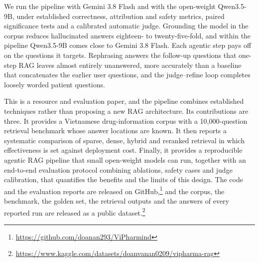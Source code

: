 We run the pipeline with Gemini 3.8 Flash and with the open-weight Qwen3.5-9B, under established correctness, attribution and safety metrics, paired significance tests and a calibrated automatic judge. Grounding the model in the corpus reduces hallucinated answers eighteen- to twenty-five-fold, and within the pipeline Qwen3.5-9B comes close to Gemini 3.8 Flash. Each agentic step pays off on the questions it targets. Rephrasing answers the follow-up questions that one-step RAG leaves almost entirely unanswered, more accurately than a baseline that concatenates the earlier user questions, and the judge--refine loop completes loosely worded patient questions.

This is a resource and evaluation paper, and the pipeline combines established techniques rather than proposing a new RAG architecture. Its contributions are three. It provides a Vietnamese drug-information corpus with a 10{,}000-question retrieval benchmark whose answer locations are known. It then reports a systematic comparison of sparse, dense, hybrid and reranked retrieval in which effectiveness is set against deployment cost. Finally, it provides a reproducible agentic RAG pipeline that small open-weight models can run, together with an end-to-end evaluation protocol combining ablations, safety cases and judge calibration, that quantifies the benefits and the limits of this design. The code and the evaluation reports are released on GitHub,\footnote{\url{https://github.com/doanan293/ViPharmind}} and the corpus, the benchmark, the golden set, the retrieval outputs and the answers of every reported run are released as a public dataset.\footnote{\url{https://www.kaggle.com/datasets/doanvanan0209/vipharma-rag}}

